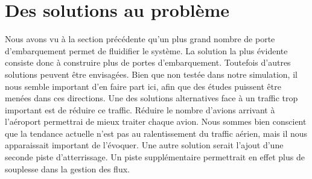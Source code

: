 \section{Des solutions au problème}
Nous avons vu à la section précédente qu'un plus grand nombre de porte d'embarquement permet de fluidifier le système. La solution la plus évidente consiste donc à construire plus de portes d'embarquement.
Toutefois d'autres solutions peuvent être envisagées. Bien que non testée dans notre simulation, il nous semble important d'en faire part ici, afin que des études puissent être menées dans ces directions.
Une des solutions alternatives face à un traffic trop important est de réduire ce traffic. Réduire le nombre d'avions arrivant à l'aéroport permettrai de mieux traiter chaque avion. Nous sommes bien conscient que la tendance actuelle n'est pas au ralentissement du traffic aérien, mais il nous apparaissait important de l'évoquer.
Une autre solution serait l'ajout d'une seconde piste d'atterrissage. Un piste supplémentaire permettrait en effet plus de souplesse dans la gestion des flux.





